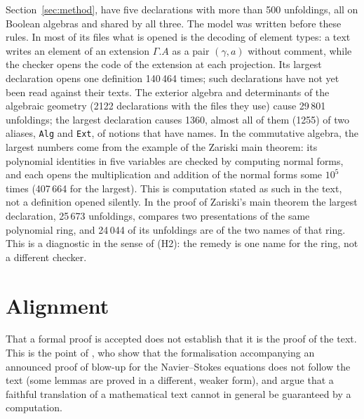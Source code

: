 \documentclass[11pt]{article}
\newcommand{\kw}[1]{\texttt{#1}}
\begin{document}
Section~\ref{sec:method}, have five declarations with more than 500
unfoldings, all on Boolean algebras and shared by all three. The model was written
before these rules. In most of its files what is opened is the decoding
of element types: a text writes an element of an extension $\Gamma.A$
as a pair $(\gamma,a)$ without comment, while the checker opens the code
of the extension at each projection. Its largest declaration opens one definition
140\,464 times; such declarations have not yet been read against their
texts. The exterior algebra and determinants of the algebraic
geometry (2122 declarations with the files they use) cause 29\,801
unfoldings; the largest declaration causes 1360, almost all of them (1255)
of two aliases, \kw{Alg} and \kw{Ext}, of notions that have names.
In the commutative algebra, the largest numbers come from the example of
the Zariski main theorem: its polynomial identities in five variables
are checked by computing normal forms, and each opens the multiplication
and addition of the normal forms some $10^5$ times (407\,664 for the
largest). This is computation stated as such in the text, not a
definition opened silently. In the proof of Zariski's main theorem the
largest declaration, 25\,673 unfoldings, compares two presentations of
the same polynomial ring, and 24\,044 of its unfoldings are of the two
names of that ring. This is a diagnostic in the sense of (H2): the
remedy is one name for the ring, not a different checker.

\section{Alignment}\label{sec:align}

That a formal proof is accepted does not establish that it is the
proof of the text. This is the point of \cite{BCH}, who show that the
formalisation accompanying an announced proof of blow-up for the
Navier--Stokes equations does not follow the text (some lemmas are proved
in a different, weaker form), and argue that a faithful translation of a
mathematical text cannot in general be guaranteed by a computation.
\end{document}
